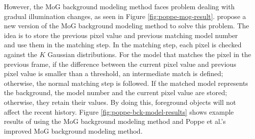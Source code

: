 However, the MoG background modeling method faces problem \DIFdelbegin {}\DIFdelend dealing
with gradual illumination changes, as seen in
Figure \ref{fig:poppe-mog-result}. 
propose a new version of the MoG background modeling method to solve
this problem. The idea is to store the previous pixel value and
previous matching model number and use them in the matching step. In
the matching step, each pixel is checked against the $K$ Gaussian
distributions. For the model that matches the pixel in the previous
frame, if the difference between the current pixel value and previous
pixel value is smaller than a threshold, an intermediate match is
defined; otherwise, the normal matching step is followed. If the
matched model represents the background, the model number and the
current pixel value are stored; otherwise, they retain their
values. By doing this, foreground objects will not affect the recent
history. Figure \ref{fig:poppe-bck-model-results} shows example
results of using the MoG background modeling method and Poppe et al.'s
improved MoG background modeling method.

